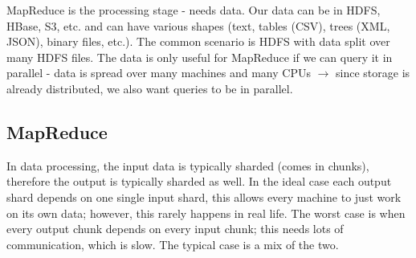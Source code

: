 \documentclass[11pt,oneside,a4paper]{article}
\begin{document}
MapReduce is the processing stage - needs data. Our data can be in HDFS, HBase, S3, etc. and can have various shapes (text, tables (CSV), trees (XML, JSON), binary files, etc.). The common scenario is HDFS with data split over many HDFS files. The data is only useful for MapReduce if we can query it in parallel - data is spread over many machines and many CPUs $\rightarrow$ since storage is already distributed, we also want queries to be in parallel.

\subsection{MapReduce}

In data processing, the input data is typically sharded (comes in chunks), therefore the output is typically sharded as well. In the ideal case each output shard depends on one single input shard, this allows every machine to just work on its own data; however, this rarely happens in real life. The worst case is when every output chunk depends on every input chunk; this needs lots of communication, which is slow. The typical case is a mix of the two.
\end{document}
